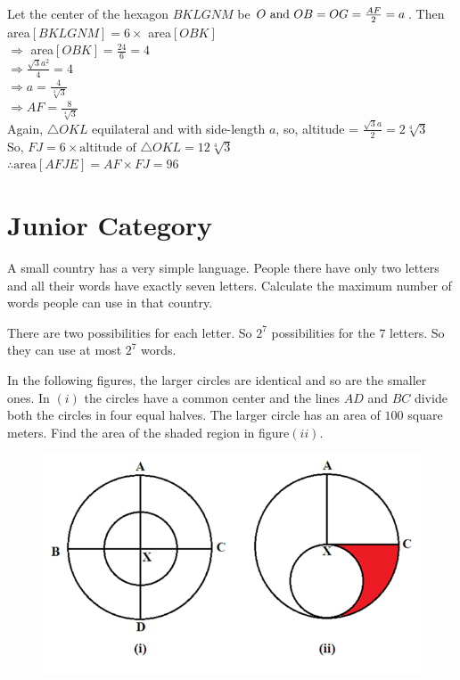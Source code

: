 \documentclass{subfile}
\begin{document}
	\begin{solution} Let the center of the hexagon $BKLGNM$ be $O \text{ and }\\ OB=OG=\frac{AF}{2}=a$. Then\\
		area$[BKLGNM]=6\times$ area$[OBK]$\\
		$\Rightarrow$ area$[OBK]=\frac{24}{6}=4$\\
		$\Rightarrow \frac{\sqrt{3}a^2}{4}=4$\\
		$\Rightarrow a=\frac{4}{\sqrt[4]{3}}$\\
		$\Rightarrow AF=\frac{8}{\sqrt[4]{3}}$\\
		Again, $\triangle OKL$ equilateral and with side-length $a$,
		so, altitude = $\frac{\sqrt{3}a}{2}=2\sqrt[4]{3}$\\
		So, $FJ=6\times \text{altitude of } \triangle OKL=12\sqrt[4]{3}$\\
		$\therefore \text{area} [AFJE]=AF\times FJ=96$

	\end{solution}

	\section{Junior Category}
	\begin{problem} A small country has a very simple language. People there have only two letters and all their words
	have exactly seven letters. Calculate the maximum number of words people can use in that country.

	\end{problem}

	\begin{solution} There are two possibilities for each letter. So $2^{7}$ possibilities for the $7$ letters. So they can use at most $2^{7}$ words.
    \end{solution}


	\begin{problem} In the following figures, the larger circles are identical and so are the smaller ones. In $(i)$ the circles
	have a common center and the lines $AD$ and $BC$ divide both the circles in four equal halves. The larger
	circle has an area of $100$ square meters. Find the area of the shaded region in figure$(ii)$.\\
	\begin{figure}[h]
		\centering
		\includegraphics[width=0.7\linewidth]{Prob2.png}
	\end{figure}

	\end{problem}
\end{document}
